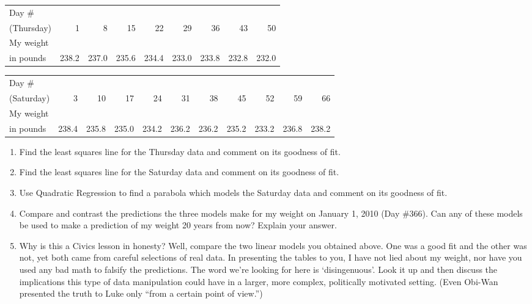 \begin{enumerate}
\medskip

\small

\noindent \begin{tabular}{|l|r|r|r|r|r|r|r|r|} \hline
Day \# & & & & & & & &  \\
(Thursday) & 1 & 8 & 15 & 22 & 29 & 36 & 43 & 50 \\ 
\hline 
My weight & & & & & & & & \\
in pounds & 238.2 & 237.0 & 235.6 & 234.4 & 233.0 & 233.8 & 232.8 & 232.0\\ \hline
\end{tabular}

\medskip

\noindent \begin{tabular}{|l|r|r|r|r|r|r|r|r|r|r|} \hline
Day \# & & & & & & & & & & \\
(Saturday) & 3 & 10 & 17 & 24 & 31 & 38 & 45 & 52 & 59 & 66 \\ 
\hline 
My weight & & & & & & & & & & \\
in pounds & 238.4 & 235.8 & 235.0 & 234.2 & 236.2 & 236.2 & 235.2 & 233.2 & 236.8 & 238.2\\ \hline
\end{tabular}

\normalsize

\medskip

\begin{enumerate}

\item Find the least squares line for the Thursday data and comment on its goodness of fit.
\item Find the least squares line for the Saturday data and comment on its goodness of fit.
\item Use Quadratic Regression to find a parabola which models the Saturday data and comment on its goodness of fit.
\item Compare and contrast the predictions the three models make for my weight on January 1, 2010 (Day \#366).  Can any of these models be used to make a prediction of my weight 20 years from now?  Explain your answer.
\item Why is this a Civics lesson in honesty?  Well, compare the two linear models you obtained above.  One was a good fit and the other was not, yet both came from careful selections of real data.  In presenting the tables to you, I have not lied about my weight, nor have you used any bad math to falsify the predictions.  The word we're looking for here is `disingenuous'.  Look it up and then discuss the implications this type of data manipulation could have in a larger, more complex, politically motivated setting.  (Even Obi-Wan presented the truth to Luke only ``from a certain point of view.'')


\end{enumerate}
\end{enumerate}
